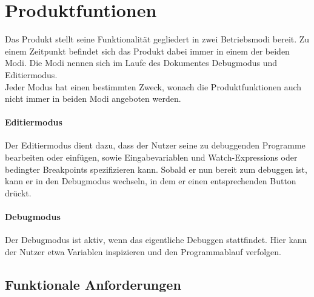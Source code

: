 \documentclass[parskip=full]{scrartcl}
\begin{document}
\newpage

\section{Produktfuntionen}
Das Produkt stellt seine Funktionalität gegliedert in zwei Betriebsmodi bereit. Zu einem Zeitpunkt befindet sich das Produkt dabei immer in einem der beiden Modi. Die Modi nennen sich im Laufe des Dokumentes \gls{Debugmodus} und \gls{Editiermodus}. \\ Jeder Modus hat einen bestimmten Zweck, wonach die Produktfunktionen auch nicht immer in beiden Modi angeboten werden. 
\paragraph{Editiermodus} Der Editiermodus dient dazu, dass der Nutzer seine zu debuggenden Programme bearbeiten oder einfügen, sowie Eingabevariablen und \glspl{Watch-Expression} oder \glspl{bedingter Breakpoint} spezifizieren kann. Sobald er nun bereit zum debuggen ist, kann er in den Debugmodus wechseln, in dem er einen entsprechenden Button drückt. 
\paragraph{Debugmodus} Der Debugmodus ist aktiv, wenn das eigentliche Debuggen stattfindet. Hier kann der Nutzer etwa Variablen inspizieren und den Programmablauf verfolgen. 
	 	\subsection{Funktionale Anforderungen}
\end{document}
